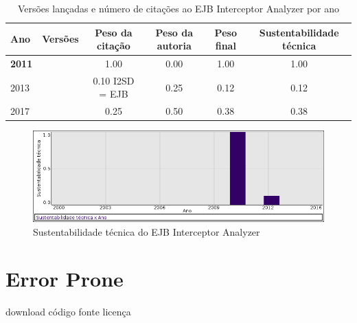 \begin{table}[H]
\caption{Versões lançadas e número de citações ao EJB Interceptor Analyzer por ano}
\centering
\begin{tabular}{| l | c | c | c | c | c |}
  \hline
  Ano & Versões & Peso da citação & Peso da autoria & Peso final & Sustentabilidade técnica \\
  \hline
            {\bf 2011}
          &
          
          &
          1.00
          &
          0.00
          &
          1.00
          &
            {\color{blue} 1.00}
          \\
\hline
            2013
          &
          
          &
          0.10
            {\tiny I2SD = EJB}
          &
          0.25
          &
          0.12
          &
            {\color{red} 0.12}
          \\
\hline
            2017
          &
          
          &
          0.25
          &
          0.50
          &
          0.38
          &
            {\color{red} 0.38}
          \\
\hline
\end{tabular}
\end{table}

\begin{figure}[h]
  \center
  \includegraphics[scale=0.50]{imagens/softwares-charts/ejb.png}
  \caption{Sustentabilidade técnica do EJB Interceptor Analyzer}
\end{figure}


\section{Error Prone}
\checkmark download
\checkmark código fonte
\checkmark licença


